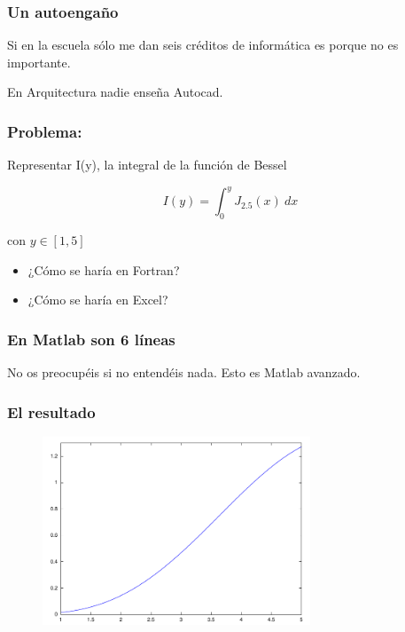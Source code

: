 \documentclass[12pt]{beamer}
\begin{document}
\begin{large}
\begin{frame}
  \frametitle{Un autoengaño}
  \begin{LARGE}
  \begin{center}
    Si en la escuela sólo me dan seis créditos de informática es
    porque no es importante.
  \end{center}
  \end{LARGE}
\end{frame}

\begin{frame}
  \begin{LARGE}
  \begin{center}
    En Arquitectura nadie enseña Autocad.
  \end{center}
  \end{LARGE}
\end{frame}

\begin{frame}
\frametitle{Problema:}
Representar I(y), la integral de la función de Bessel

\[ I(y)=\int_0^y J_{2.5}(x)\ dx \]

con $y \in [1,5]$

\begin{itemize}
\item ¿Cómo se haría en Fortran?
\item ¿Cómo se haría en Excel?
\end{itemize}
\end{frame}


\begin{frame}
\frametitle{En Matlab son 6 líneas}
\testcode
No os preocupéis si no entendéis nada.  Esto es Matlab avanzado.
\end{frame}

\begin{frame}
\frametitle{El resultado}
  \begin{figure}[h]
    \centering{}
    \includegraphics[width=8cm, keepaspectratio]{fig/primera.pdf}
  \end{figure}
\end{frame}



\end{large}
\end{document}
